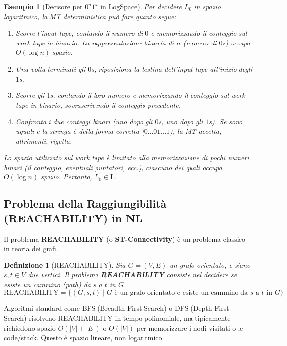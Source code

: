\documentclass[a4paper, 11pt]{book} %
\newtheorem{definition}[theorem]{Definizione}
\newtheorem{example}[theorem]{Esempio}
\theoremstyle{definition}
\begin{document}
\begin{example}[Decisore per $0^n1^n$ in LogSpace]
Per decidere $L_0$ in spazio logaritmico, la MT deterministica può fare quanto segue:
\begin{enumerate}
    \item Scorre l'input tape, contando il numero di $0$ e memorizzando il conteggio sul work tape in binario. La rappresentazione binaria di $n$ (numero di $0$s) occupa $O(\log n)$ spazio.
    \item Una volta terminati gli $0$s, riposiziona la testina dell'input tape all'inizio degli $1$s.
    \item Scorre gli $1$s, contando il loro numero e memorizzando il conteggio sul work tape in binario, sovrascrivendo il conteggio precedente.
    \item Confronta i due conteggi binari (uno dopo gli $0$s, uno dopo gli $1$s). Se sono uguali e la stringa è della forma corretta ($0...01...1$), la MT accetta; altrimenti, rigetta.
\end{enumerate}
Lo spazio utilizzato sul work tape è limitato alla memorizzazione di pochi numeri binari (il conteggio, eventuali puntatori, ecc.), ciascuno dei quali occupa $O(\log n)$ spazio. Pertanto, $L_0 \in \text{L}$.
\end{example}

\subsection{Problema della Raggiungibilità (REACHABILITY) in NL}

Il problema \textbf{REACHABILITY} (o \textbf{ST-Connectivity}) è un problema classico in teoria dei grafi.

\begin{definition}[REACHABILITY]
Sia $G=(V,E)$ un grafo orientato, e siano $s, t \in V$ due vertici. Il problema \textbf{REACHABILITY} consiste nel decidere se esiste un cammino (path) da $s$ a $t$ in $G$.
\[ \text{REACHABILITY} = \{ (G, s, t) \mid G \text{ è un grafo orientato e esiste un cammino da } s \text{ a } t \text{ in } G \} \]
\end{definition}

Algoritmi standard come BFS (Breadth-First Search) o DFS (Depth-First Search) risolvono REACHABILITY in tempo polinomiale, ma tipicamente richiedono spazio $O(|V| + |E|)$ o $O(|V|)$ per memorizzare i nodi visitati o le code/stack. Questo è spazio lineare, non logaritmico.
\end{document}
